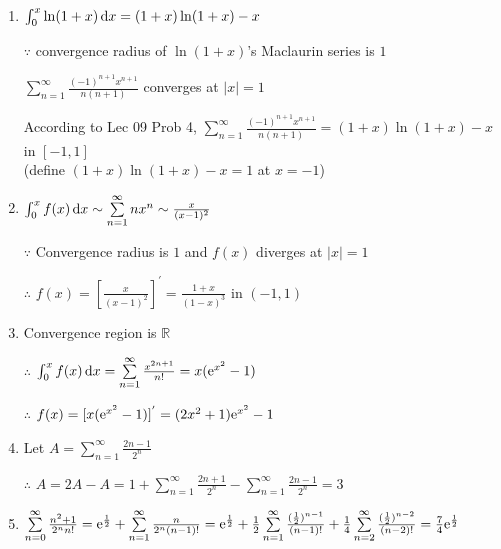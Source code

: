 \begin{enumerate}[1]
\begin{enumerate}[(1)]
        \item
        $\int_0^x  \ln (1+x)\dif x=(1+x) \ln (1+x)-x$
        \par $\because$ convergence radius of $ \ln (1+x)$'s Maclaurin series is $1$
        \par $\sum\limits_{n=1}^\infty \frac{(-1)^{n+1}x^{n+1}}{n(n+1)}$ converges at $|x|=1$
        \par According to Lec 09 Prob 4, $\sum\limits_{n=1}^\infty \frac{(-1)^{n+1}x^{n+1}}{n(n+1)}=(1+x ) \ln (1+x)-x$ in $[-1,1]$ \\(define $(1+x) \ln (1+x)-x=1$ at $x=-1$)
        
        \item
        \par $\int_0^x f(x)\dif x\sim\sum\limits_{n=1}^\infty nx^n\sim \frac{x}{(x-1)^2}$
        \par $\because$ Convergence radius is $1$ and $f(x)$ diverges at $|x|=1$
        \par $\therefore$ $f(x)=\left[\frac{x}{(x-1)^2}\right]^{'}=\frac{1+x}{(1-x)^3}$ in $(-1,1)$
        
        \item
        Convergence region is $\mathbb{R}$
        \par $\therefore$ $\int_0^x f(x)\dif x = \sum\limits_{n=1}^\infty \frac{x^{2n+1}}{n!}=x(\me^{x^2}-1)$
        \par $\therefore$ $f(x)=[x(\mathrm{e}^{x^2}-1)]^{'}=(2x^2+1)\mathrm{e}^{x^2}-1$
        
        \item
        Let $A=\sum\limits_{n=1}^\infty \frac{2n-1}{2^n}$
        \par $\therefore$ $A=2A-A=1+\sum\limits_{n=1}^\infty  \frac{2n+1}{2^n}    -\sum\limits_{n=1}^\infty \frac{2n-1}{2^n}=3$
        
        \item
        $\sum\limits_{n=0}^\infty \frac{n^2+1}{2^n n!}=\mathrm{e}^{\frac{1}{2}}+\sum\limits_{n=1}^\infty \frac{n}{2^n(n-1)!}=\mathrm{e}^{\frac{1}{2}}+\frac{1}{2}\sum\limits_{n=1}^\infty\frac{(\frac{1}{2})^{n-1}}{(n-1)!}+\frac{1}{4}\sum\limits_{n=2}^\infty \frac{(\frac{1}{2})^{n-2}}{(n-2)!}=\frac{7}{4}\mathrm{e}^{\frac{1}{2}}$
        \end{enumerate}
    \end{enumerate}
